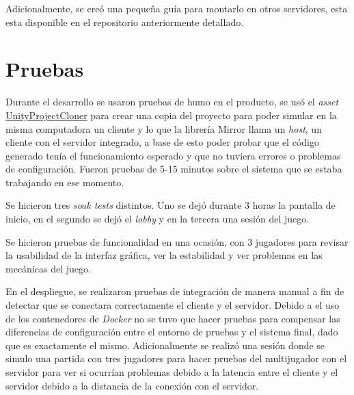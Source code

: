 Adicionalmente, se creó una pequeña guía para montarlo en otros servidores, esta esta disponible en el repositorio anteriormente detallado.

\section{Pruebas}
Durante el desarrollo se usaron pruebas de humo en el producto, se usó el \textit{asset} \href{https://github.com/hwaet/UnityProjectCloner}{UnityProjectCloner} para crear una copia del proyecto para poder simular en la misma computadora un cliente y lo que la librería Mirror llama un \textit{host}, un cliente con el servidor integrado, a base de esto poder probar que el código generado tenía el funcionamiento esperado y que no tuviera errores o problemas de configuración. Fueron pruebas de 5-15 minutos sobre el sistema que se estaba trabajando en ese momento.

Se hicieron tres \textit{soak tests} distintos. Uno se dejó durante 3 horas la pantalla de inicio, en el segundo se dejó el \textit{lobby} y en la tercera una sesión del juego.

Se hicieron pruebas de funcionalidad en una ocasión, con 3 jugadores para revisar la usabilidad de la interfaz gráfica, ver la estabilidad y ver problemas en las mecánicas del juego.

En el despliegue, se realizaron pruebas de integración de manera manual a fin de detectar que se conectara correctamente el cliente y el servidor. Debido a el uso de los contenedores de \textit{Docker} no se tuvo que hacer pruebas para compensar las diferencias de configuración entre el entorno de pruebas y el sistema final, dado que es exactamente el mismo. Adicionalmente se realizó una sesión donde se simulo una partida con tres jugadores para hacer pruebas del multijugador con el servidor para ver si ocurrían problemas debido a la latencia entre el cliente y el servidor debido a la distancia de la conexión con el servidor.

